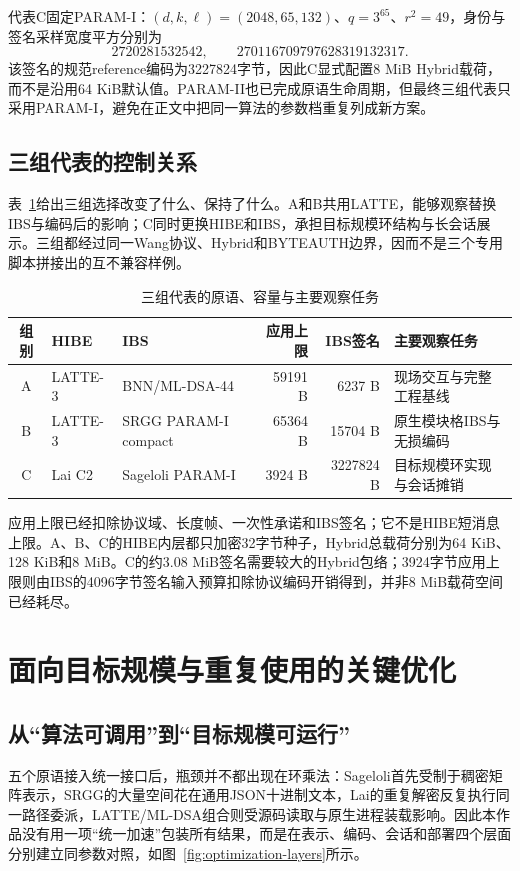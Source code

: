 \documentclass[UTF8,a4paper,12pt,oneside,openany,fontset=fandol]{ctexrep}
\begin{document}
代表C固定PARAM-I：$(d,k,\ell)=(2048,65,132)$、$q=3^{65}$、$r^2=49$，身份与签名采样宽度平方分别为
\[
  2720281532542,
  \qquad
  270116709797628319132317.
\]
该签名的规范reference编码为3227824字节，因此C显式配置8 MiB Hybrid载荷，而不是沿用64 KiB默认值。PARAM-II也已完成原语生命周期，但最终三组代表只采用PARAM-I，避免在正文中把同一算法的参数档重复列成新方案。

\section{三组代表的控制关系}
表~\ref{tab:representative-control}给出三组选择改变了什么、保持了什么。A和B共用LATTE，能够观察替换IBS与编码后的影响；C同时更换HIBE和IBS，承担目标规模环结构与长会话展示。三组都经过同一Wang协议、Hybrid和BYTEAUTH边界，因而不是三个专用脚本拼接出的互不兼容样例。

\begin{table}[htbp]
\centering
\small
\caption{三组代表的原语、容量与主要观察任务}
\label{tab:representative-control}
\begin{tabularx}{\textwidth}{@{}c>{\raggedright\arraybackslash}p{}>{\raggedright\arraybackslash}p{}rr>{\raggedright\arraybackslash}X@{}}
\toprule
\rowcolor{black!8} 组别 & HIBE & IBS & 应用上限 & IBS签名 & 主要观察任务 \\
\midrule
A & LATTE-3 & BNN/ML-DSA-44 & 59191 B & 6237 B & 现场交互与完整工程基线 \\
B & LATTE-3 & SRGG PARAM-I compact & 65364 B & 15704 B & 原生模块格IBS与无损编码 \\
C & Lai C2 & Sageloli PARAM-I & 3924 B & 3227824 B & 目标规模环实现与会话摊销 \\
\bottomrule
\end{tabularx}
\end{table}

应用上限已经扣除协议域、长度帧、一次性承诺和IBS签名；它不是HIBE短消息上限。A、B、C的HIBE内层都只加密32字节种子，Hybrid总载荷分别为64 KiB、128 KiB和8 MiB。C的约3.08 MiB签名需要较大的Hybrid包络；3924字节应用上限则由IBS的4096字节签名输入预算扣除协议编码开销得到，并非8 MiB载荷空间已经耗尽。

\chapter{面向目标规模与重复使用的关键优化}

\section{从“算法可调用”到“目标规模可运行”}
五个原语接入统一接口后，瓶颈并不都出现在环乘法：Sageloli首先受制于稠密矩阵表示，SRGG的大量空间花在通用JSON十进制文本，Lai的重复解密反复执行同一路径委派，LATTE/ML-DSA组合则受源码读取与原生进程装载影响。因此本作品没有用一项“统一加速”包装所有结果，而是在表示、编码、会话和部署四个层面分别建立同参数对照，如图~\ref{fig:optimization-layers}所示。
\end{document}
